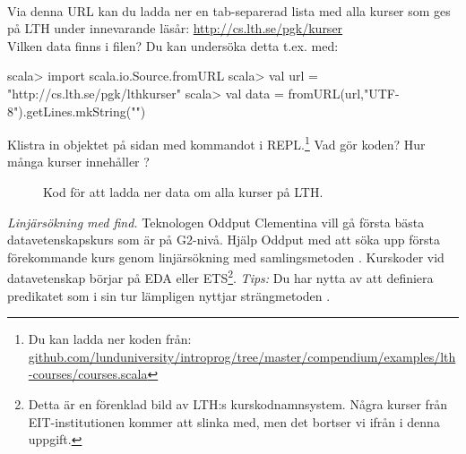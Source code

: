 \QUESTEND





\QUESTBEGIN

\Task \label{task:linsearch-lth}\what~

\Subtask Via denna URL kan du ladda ner en tab-separerad lista med alla kurser som ges på LTH under innevarande läsår: \url{http://cs.lth.se/pgk/kurser} \\Vilken data finns i filen? Du kan undersöka detta t.ex. med:
\begin{REPLnonum}
scala> import scala.io.Source.fromURL
scala> val url = "http://cs.lth.se/pgk/lthkurser"
scala> val data = fromURL(url,"UTF-8").getLines.mkString("\n")
\end{REPLnonum}

\Subtask \label{subtask:download-lthcourses} Klistra in objektet  på sidan \pageref{lth-courses} med kommandot  i REPL.\footnote{Du kan ladda ner koden från: \\ \href{https://raw.githubusercontent.com/lunduniversity/introprog/master/compendium/examples/lth-courses/courses.scala}{github.com/lunduniversity/introprog/tree/master/compendium/examples/lth-courses/courses.scala}} Vad gör koden? Hur många kurser innehåller ?

\begin{figure}[h]
  \caption{Kod för att ladda ner data om alla kurser på LTH.}
  \label{lth-courses}
\end{figure}


\Subtask \emph{Linjärsökning med find.} Teknologen Oddput Clementina vill gå första bästa datavetenskapskurs som är på G2-nivå. Hjälp Oddput med att söka upp första förekommande kurs genom linjärsökning med samlingsmetoden . Kurskoder vid datavetenskap börjar på EDA eller ETS\footnote{Detta är en förenklad bild av LTH:s kurskodnamnsystem. Några kurser från EIT-institutionen  kommer att slinka med, men det bortser vi ifrån i denna uppgift.}. \emph{Tips:} Du har nytta av att definiera predikatet  som i sin tur lämpligen nyttjar strängmetoden .

